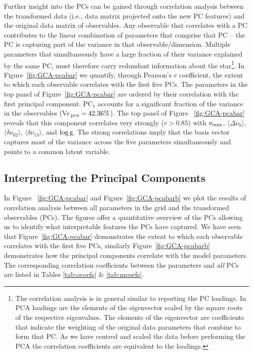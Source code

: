 Further insight into the PCs can be gained through correlation analysis between the transformed data (i.e., data matrix projected onto the new PC features) and the original data matrix of observables.
Any observable that correlates with a PC contributes to the linear combination of parameters that comprise that PC -- the PC is capturing part of the variance in that observable/dimension. 
Multiple parameters that simultaneously have a large fraction of their variance explained by the same PC, must therefore carry redundant information about the star\footnote{The correlation analysis is in general similar to reporting the PC loadings. 
In PCA loadings are the elements of the eigenvector scaled by the square roots of the respective eigenvalues.
The elements of the eigenvector are coefficients that indicate the weighting of the original data parameters that combine to form that PC. 
As we have centred and scaled the data before performing the PCA the correlation coefficients are equivalent to the loadings.}.
In Figure~\ref{fig:GCA-pcabar} we quantify, through Pearson's $r$ coefficient, the extent to which each observable correlates with the first five PCs.
The parameters in the top panel of Figure~\ref{fig:GCA-pcabar} are ordered by their correlation with the first principal component. 
PC$_1$ accounts for a significant fraction of the variance in the observables (Ve$_{\, \rm{pca}}=42.36\%$). 
The top panel of  Figure~ \ref{fig:GCA-pcabar} reveals that this component correlates very strongly 
($r > 0.85$)  with   
$\nu_{\rm{max}}$, 
$\langle\Delta\nu_0\rangle$,
$\langle\delta\nu_{02}\rangle$, 
$\langle\delta\nu_{13}\rangle$,
and $\log \rm{g}$.  
The strong correlations imply that the basis vector captures most of the variance across the five parameters simultaneously and points to a common latent variable. 


\subsection{Interpreting the Principal Components}
\label{sec:intPC}


In Figure~ \ref{fig:GCA-pcabar} and Figure~\ref{fig:GCA-pcabarb} we plot the results of correlation analysis between all parameters in the grid and the transformed observables (PCs). 
The figures offer a quantitative overview of the PCs allowing  us to identify what interpretable features the PCs have captured.
We have seen that Figure~\ref{fig:GCA-pcabar} demonstrates the extent to which each observable correlates with the first five PCs, similarly  Figure~\ref{fig:GCA-pcabarb} demonstrates how the principal components correlate with the model parameters. The corresponding correlation coefficients between the parameters and \emph{all} PCs are listed in Tables \ref{tab:ocoefs} \& \ref{tab:mcoefs}.


